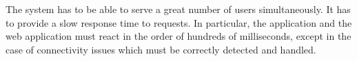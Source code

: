 The system has to be able to serve a great number of users simultaneously. It has to provide a slow response time to requests. In particular, the application and the web application must react in the order of hundreds of milliseconds, except in the case of connectivity issues which must be correctly detected and handled.